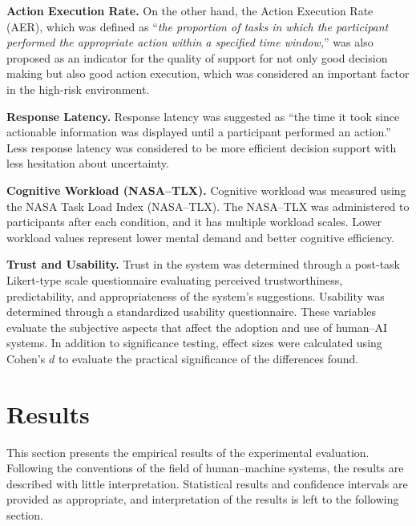 \documentclass[journal]{IEEEtran}
\theoremstyle{plain}
\theoremstyle{definition}
\begin{document}
    \textbf{Action Execution Rate.}
    On the other hand, the Action Execution Rate (AER), which was defined as ``\textit{the proportion of tasks in which the participant performed the appropriate action within a specified time window,}'' was also proposed as an indicator for the quality of support for not only good decision making but also good action execution, which was considered an important factor in the high-risk environment.

    \textbf{Response Latency.}
    Response latency was suggested as “the time it took since actionable information was displayed until a participant performed an action.” Less response latency was considered to be more efficient decision support with less hesitation about uncertainty.

    \textbf{Cognitive Workload (NASA--TLX).}
    Cognitive workload was measured using the NASA Task Load Index (NASA--TLX). The NASA--TLX was administered to participants after each condition, and it has multiple workload scales. Lower workload values represent lower mental demand and better cognitive efficiency.

    \textbf{Trust and Usability.}
    Trust in the system was determined through a post-task Likert-type scale questionnaire evaluating perceived trustworthiness, predictability, and appropriateness of the system's suggestions. Usability was determined through a standardized usability questionnaire. These variables evaluate the subjective aspects that affect the adoption and use of human--AI systems.
    In addition to significance testing, effect sizes were calculated using Cohen's $d$ to evaluate the practical significance of the differences found.

    \section{Results}
    This section presents the empirical results of the experimental evaluation. Following the conventions of the field of human--machine systems, the results are described with little interpretation. Statistical results and confidence intervals are provided as appropriate, and interpretation of the results is left to the following section.
\end{document}
